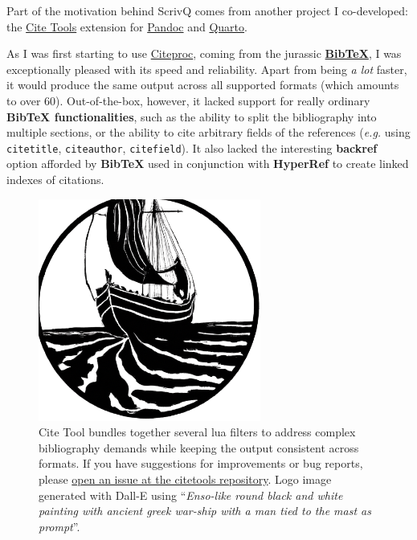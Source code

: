 \documentclass[
  12pt,
  a4paper,
  oneside,
  numbers=noenddot,
  titlepage,
  toclink=all,
  toc=bibliography]{scrbook}
\theoremstyle{definition}
\theoremstyle{definition}
\theoremstyle{definition}
\theoremstyle{plain}
\theoremstyle{plain}
\theoremstyle{plain}
\theoremstyle{plain}
\theoremstyle{plain}
\theoremstyle{remark}
\begin{document}
Part of the motivation behind ScrivQ comes from another project I
co-developed: the
\href{https://bcdavasconcelos.github.io/citetools}{Cite Tools} extension
for \href{https://pandoc.org}{Pandoc} and
\href{https://quarto.org}{Quarto}.

As I was first starting to use
\href{https://en.wikipedia.org/wiki/CiteProc}{Citeproc}, coming from the
jurassic
\textbf{\href{https://en.wikipedia.org/wiki/BibTeX\#Entry_types}{BibTeX}},
I was exceptionally pleased with its speed and reliability. Apart from
being \emph{a lot} faster, it would produce the same output across all
supported formats (which amounts to over 60). Out-of-the-box, however,
it lacked support for really ordinary \textbf{BibTeX functionalities},
such as the ability to split the bibliography into multiple sections, or
the ability to cite arbitrary fields of the references (\emph{e.g.}
using \texttt{citetitle}, \texttt{citeauthor}, \texttt{citefield}). It
also lacked the interesting \textbf{backref} option afforded by
\textbf{BibTeX} used in conjunction with \textbf{HyperRef} to create
linked indexes of citations.

\begin{figure}

{\centering \includegraphics[width=2.875in,height=2.875in]{citetools.png}

}

\caption{\label{fig-scriv41}Cite Tool bundles together several lua
filters to address complex bibliography demands while keeping the output
consistent across formats. If you have suggestions for improvements or
bug reports, please
\href{https://github.com/bcdavasconcelos/citetools/issues/new/choose}{open
an issue at the citetools repository}. Logo image generated with Dall-E
using \enquote{\emph{Enso-like round black and white painting with
ancient greek war-ship with a man tied to the mast as prompt}}.}

\end{figure}
\end{document}
